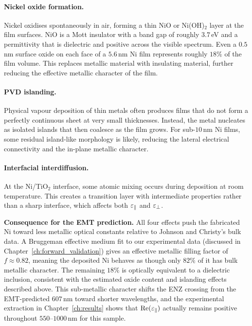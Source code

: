 \paragraph{Nickel oxide formation.}
Nickel oxidises spontaneously in air, forming a thin NiO or Ni(OH)$_2$ layer
at the film surfaces. NiO is a Mott insulator with a band gap of roughly
$3.7$\,eV and a permittivity that is dielectric and positive across the
visible spectrum. Even a $0.5$\,nm surface oxide on each face of a $5.6$\,nm
Ni film represents roughly $18\%$ of the film volume. This replaces metallic
material with insulating material, further reducing the effective metallic
character of the film.

\paragraph{PVD islanding.}
Physical vapour deposition of thin metals often produces films that do not
form a perfectly continuous sheet at very small thicknesses. Instead, the
metal nucleates as isolated islands that then coalesce as the film grows. For
sub-$10$\,nm Ni films, some residual island-like morphology is likely, reducing
the lateral electrical connectivity and the in-plane metallic character.

\paragraph{Interfacial interdiffusion.}
At the Ni/TiO$_2$ interface, some atomic mixing occurs during deposition at
room temperature. This creates a transition layer with intermediate properties
rather than a sharp interface, which affects both $\varepsilon_{\parallel}$ and $\varepsilon_{\perp}$.

\begin{warnbox}
\textbf{Consequence for the EMT prediction.} All four effects push the
fabricated Ni toward less metallic optical constants relative to Johnson and
Christy's bulk data. A Bruggeman effective medium fit to our experimental data
(discussed in Chapter~\ref{ch:forward_validation}) gives an effective metallic
filling factor of $f \approx 0.82$, meaning the deposited Ni behaves as though
only $82\%$ of it has bulk metallic character. The remaining $18\%$ is
optically equivalent to a dielectric inclusion, consistent with the estimated
oxide content and islanding effects described above. This sub-metallic character
shifts the ENZ crossing from the EMT-predicted $607$\,nm toward shorter
wavelengths, and the experimental extraction in Chapter~\ref{ch:results} shows
that $\operatorname{Re}(\varepsilon_{\parallel})$ actually remains positive throughout $550$--$1000$\,nm for
this sample.
\end{warnbox}

